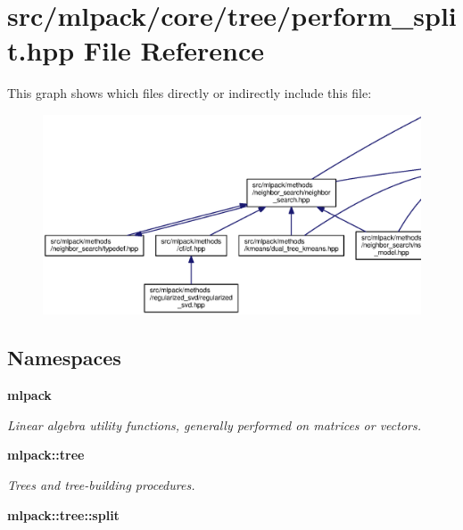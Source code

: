 \section{src/mlpack/core/tree/perform\+\_\+split.hpp File Reference}
\label{perform__split_8hpp}
This graph shows which files directly or indirectly include this file\+:
\nopagebreak
\begin{figure}[H]
\begin{center}
\leavevmode
\includegraphics[width=350pt]{perform__split_8hpp__dep__incl}
\end{center}
\end{figure}
\subsection*{Namespaces}
\begin{DoxyCompactItemize}
\item 
 {\bf mlpack}
\begin{DoxyCompactList}\small\item\em Linear algebra utility functions, generally performed on matrices or vectors. \end{DoxyCompactList}\item 
 {\bf mlpack\+::tree}
\begin{DoxyCompactList}\small\item\em Trees and tree-\/building procedures. \end{DoxyCompactList}\item 
 {\bf mlpack\+::tree\+::split}
\end{DoxyCompactItemize}
